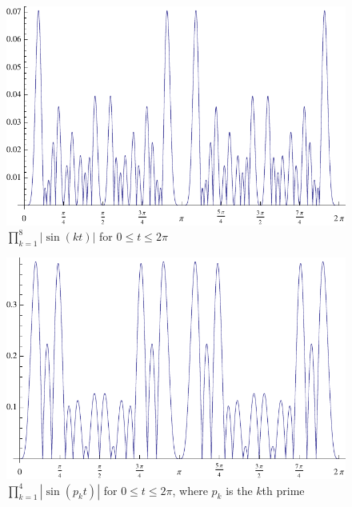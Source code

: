 \documentclass{amsart}
\begin{document}
\begin{center}
\begin{figure}
\includegraphics[scale=0.95]{k8}
\caption{$\prod_{k=1}^8 |\sin(kt)|$ for $0 \leq t \leq 2\pi$}
\label{k8}
\end{figure}
\end{center}

\begin{center}
\begin{figure}
\includegraphics[scale=0.95]{prime4}
\caption{$\prod_{k=1}^4 |\sin(p_k t)|$ for $0 \leq t \leq 2\pi$, where $p_k$ is the $k$th prime}
\label{prime4}
\end{figure}
\end{center}
\end{document}
